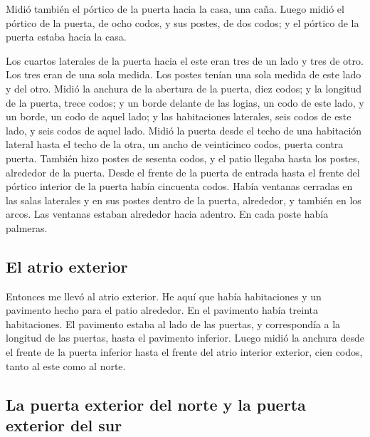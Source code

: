  Midió también el pórtico de la puerta hacia la casa, una
caña.  Luego midió el pórtico de la puerta, de ocho codos,
y sus postes, de dos codos; y el pórtico de la puerta estaba hacia la
casa.

 Los cuartos laterales de la puerta hacia el este eran
tres de un lado y tres de otro. Los tres eran de una sola medida. Los
postes tenían una sola medida de este lado y del otro. 
Midió la anchura de la abertura de la puerta, diez codos; y la longitud
de la puerta, trece codos;  y un borde delante de las
logias, un codo de este lado, y un borde, un codo de aquel lado; y las
habitaciones laterales, seis codos de este lado, y seis codos de aquel
lado.  Midió la puerta desde el techo de una habitación
lateral hasta el techo de la otra, un ancho de veinticinco codos, puerta
contra puerta.  También hizo postes de sesenta codos, y
el patio llegaba hasta los postes, alrededor de la puerta.
 Desde el frente de la puerta de entrada hasta el frente
del pórtico interior de la puerta había cincuenta codos. 
Había ventanas cerradas en las salas laterales y en sus postes dentro de
la puerta, alrededor, y también en los arcos. Las ventanas estaban
alrededor hacia adentro. En cada poste había palmeras.

\hypertarget{el-atrio-exterior}{%
\subsection{El atrio exterior}\label{el-atrio-exterior}}

 Entonces me llevó al atrio exterior. He aquí que había
habitaciones y un pavimento hecho para el patio alrededor. En el
pavimento había treinta habitaciones.  El pavimento
estaba al lado de las puertas, y correspondía a la longitud de las
puertas, hasta el pavimento inferior.  Luego midió la
anchura desde el frente de la puerta inferior hasta el frente del atrio
interior exterior, cien codos, tanto al este como al norte.

\hypertarget{la-puerta-exterior-del-norte-y-la-puerta-exterior-del-sur}{%
\subsection{La puerta exterior del norte y la puerta exterior del
sur}\label{la-puerta-exterior-del-norte-y-la-puerta-exterior-del-sur}}

